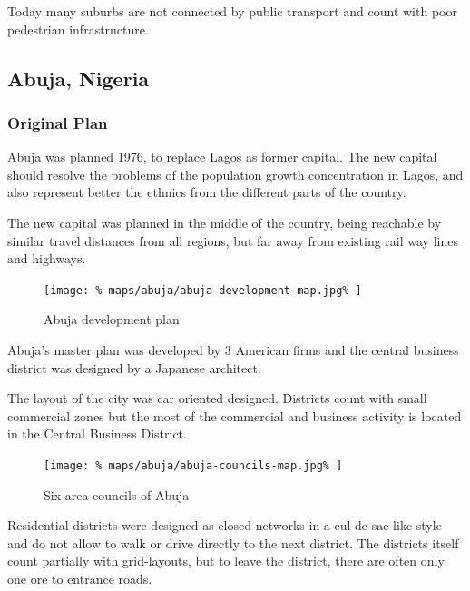 \documentclass[twocolumn]{article}
\begin{document}
			Today many suburbs are not connected by public transport and count with poor pedestrian infrastructure.
			
			
			
		\clearpage
		\begin{strip}
		\subsection{Abuja, Nigeria}
		\end{strip}
		
			
			
			\subsubsection{Original Plan}
			
			Abuja was planned 1976, to replace Lagos as former capital.
			The new capital should resolve the problems of the population growth concentration in Lagos, and also represent better the ethnics from the different parts of the country.
			
			The new capital was planned in the middle of the country, being reachable by similar travel distances from all regions, but far away from existing rail way lines and highways.
			
			\begin{figure}[H]
				\texttt{[image: \%
					maps/abuja/abuja-development-map.jpg\%
				]}
				\caption{Abuja development plan\cite{NairalandForum:AbujaMap}}
				\label{fig:map:abuja-development-plan}
			\end{figure}
			
			Abuja's master plan was developed by 3 American firms and the central business district was designed by a Japanese architect.
			
			The layout of the city was car oriented designed. Districts count with small commercial zones but the most of the commercial and business activity is located in the Central Business District.
			
			\begin{figure}[H]
				\texttt{[image: \%
					maps/abuja/abuja-councils-map.jpg\%
				]}
				\caption{Six area councils of Abuja\cite{ResearchGate:SixCouncils}}
				\label{fig:map:abuja-six-area-councils}
			\end{figure}
			
			Residential districts were designed as closed networks in a cul-de-sac like style and do not allow to walk or drive directly to the next district. The districts itself count partially with grid-layouts, but to leave the district, there are often only one ore to entrance roads.
			
\end{document}
